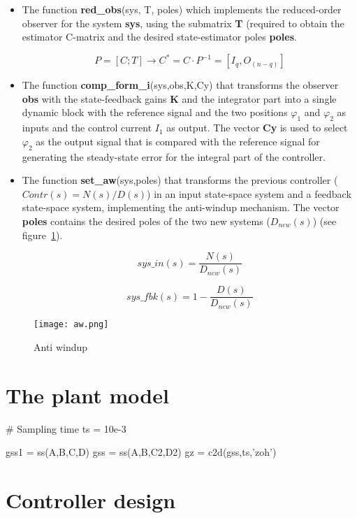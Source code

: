 \begin{itemize}
\item The function \textbf{red\_obs}(sys, T, poles) which implements the 
reduced-order observer for the system \textbf{sys}, using the submatrix 
\textbf{T} (required to obtain the estimator C-matrix 
and the desired state-estimator poles \textbf{poles}.

$$
P = [C;T] \to C^*=C \cdot P^{-1}=[I_q,O_{(n-q)}]
$$

\item The function \textbf{comp\_form\_i}(sys,obs,K,Cy) that transforms the 
observer \textbf{obs} with the state-feedback gains \textbf{K} and the 
integrator part into a single dynamic block with the reference signal and the 
two positions $\varphi_1$ and $\varphi_2$ as inputs and the control current 
$I_1$ as output. The vector \textbf{Cy} is used to select $\varphi_2$ as the 
output signal that is compared with the reference signal for generating the 
steady-state error for the integral part of the controller.

\item The function \textbf{set\_aw}(sys,poles) that transforms the previous 
controller ($Contr(s)=N(s)/D(s)$) in an input state-space system and a feedback 
state-space system, implementing the anti-windup mechanism. The vector 
\textbf{poles} contains the desired poles of the two new systems ($D_{new}(s)$) 
(see figure~\ref{F20a}).

$$
sys\_{in}(s) = \frac{N(s)}{D_{new}(s)}
$$

$$
sys\_{fbk}(s) = 1-\frac{D(s)}{D_{new}(s)}
$$

\end{itemize}

\begin{figure}[htbp]	%
\centering
\texttt{[image: aw.png]}
\caption{Anti windup}
\label{F20a}
\end{figure}

\section{The plant model}

\begin{code}
# Sampling time
ts = 10e-3

gss1 = ss(A,B,C,D)
gss = ss(A,B,C2,D2)
gz = c2d(gss,ts,'zoh')
\end{code}

\section{Controller design}

